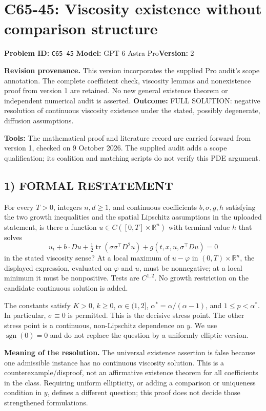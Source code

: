 \documentclass[11pt,a4paper]{article}
\newcommand{\R}{\mathbb R}
\newcommand{\sgn}{\operatorname{sgn}}
\theoremstyle{definition}
\begin{document}
\section*{C65-45: Viscosity existence without comparison structure}
\noindent\textbf{Problem ID:} \texttt{C65-45}\quad
\textbf{Model:} GPT 6 Astra Pro\quad\textbf{Version:} 2\par
\textbf{Revision provenance.} This version incorporates the supplied Pro
audit's scope annotation. The complete coefficient check, viscosity lemmas
and nonexistence proof from version 1 are retained. No new general
existence theorem or independent numerical audit is asserted.
\textbf{Outcome:} FULL SOLUTION: negative resolution of continuous viscosity existence under the stated, possibly degenerate, diffusion assumptions.\par\textbf{Tools:} The mathematical proof and literature record are carried forward from version 1, checked on 9 October 2026. The supplied audit adds a scope qualification; its coalition and matching scripts do not verify this PDE argument.
\subsection*{1) FORMAL RESTATEMENT}
For every $T>0$, integers $n,d\ge1$, and continuous coefficients $b,\sigma,g,h$ satisfying the two growth inequalities and the spatial Lipschitz assumptions in the uploaded statement, is there a function $u\in C([0,T]\times\R^n)$ with terminal value $h$ that solves
\[
 u_t+b\cdot Du+\tfrac12\operatorname{tr}(\sigma\sigma^\top D^2u)
       +g(t,x,u,\sigma^\top Du)=0
\]
in the stated viscosity sense? At a local maximum of $u-\varphi$ in $(0,T)\times\R^n$, the displayed expression, evaluated on $\varphi$ and $u$, must be nonnegative; at a local minimum it must be nonpositive. Tests are $C^{1,2}$. No growth restriction on the candidate continuous solution is added.

The constants satisfy $K>0$, $k\ge0$, $\alpha\in(1,2]$, $\alpha^*=\alpha/(\alpha-1)$, and $1\le p<\alpha^*$. In particular, $\sigma\equiv0$ is permitted. This is the decisive stress point. The other stress point is a continuous, non-Lipschitz dependence on $y$. We use $\sgn(0)=0$ and do not replace the question by a uniformly elliptic version.

\textbf{Meaning of the resolution.} The universal existence assertion is
false because one admissible instance has no continuous viscosity solution.
This is a counterexample/disproof, not an affirmative existence theorem
for all coefficients in the class. Requiring uniform ellipticity, or adding
a comparison or uniqueness condition in $y$, defines a different question;
this proof does not decide those strengthened formulations.
\end{document}
